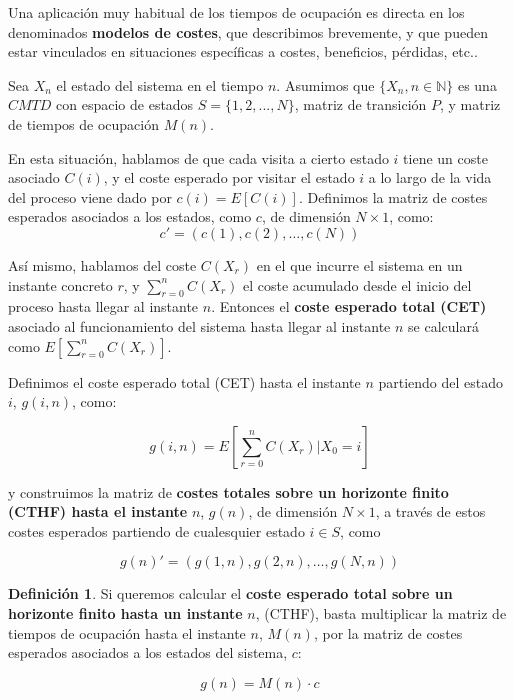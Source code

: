\documentclass[
]{book}
\newenvironment{yellowbox}{
  \definecolor{shadecolor}{rgb}{210, 180, 140}  
  \color{black}
  \begin{shaded}}
 {\end{shaded}}
\theoremstyle{definition}
\newtheorem{definition}{Definición}[chapter]
\theoremstyle{definition}
\theoremstyle{definition}
\theoremstyle{definition}
\theoremstyle{remark}
\begin{document}
Una aplicación muy habitual de los tiempos de ocupación es directa en los denominados \textbf{modelos de costes}, que describimos brevemente, y que pueden estar vinculados en situaciones específicas a costes, beneficios, pérdidas, etc..

Sea \(X_n\) el estado del sistema en el tiempo \(n\). Asumimos que \(\{X_n, n \in \mathbb{N}\}\) es una \(CMTD\) con espacio de estados \(S =\{1, 2,...,N\}\), matriz de transición \(P\), y matriz de tiempos de ocupación \(M(n)\).

En esta situación, hablamos de que cada visita a cierto estado \(i\) tiene un coste asociado \(C(i)\), y el coste esperado por visitar el estado \(i\) a lo largo de la vida del proceso viene dado por \(c(i) = E[C(i)]\). Definimos la matriz de costes esperados asociados a los estados, como \(c\), de dimensión \(N\times 1\), como: \[c' = (c(1),c(2),\ldots,c(N))\]

Así mismo, hablamos del coste \(C(X_r)\) en el que incurre el sistema en un instante concreto \(r\), y \(\sum_{r=0}^n C(X_r)\) el coste acumulado desde el inicio del proceso hasta llegar al instante \(n\). Entonces el \textbf{coste esperado total (CET)} asociado al funcionamiento del sistema hasta llegar al instante \(n\) se calculará como \(E\left[\sum_{r=0}^n C(X_r)\right]\).

Definimos el coste esperado total (CET) hasta el instante \(n\) partiendo del estado \(i\), \(g(i,n)\), como:

\[g(i,n) = E\left[\sum_{r=0}^n C(X_r)| X_0 = i \right]\]

y construimos la matriz de \textbf{costes totales sobre un horizonte finito (CTHF) hasta el instante} \(n\), \(g(n)\), de dimensión \(N \times 1\), a través de estos costes esperados partiendo de cualesquier estado \(i \in S\), como

\[g(n)' = (g(1,n),g(2,n),\ldots,g(N,n))\]

\begin{yellowbox}

\begin{definition}

Si queremos calcular el \textbf{coste esperado total sobre un horizonte finito hasta un instante} \(n\), (CTHF), basta multiplicar la matriz de tiempos de ocupación hasta el instante \(n\), \(M(n)\), por la matriz de costes esperados asociados a los estados del sistema, \(c\):

\begin{equation}
g(n) = M(n) \cdot c
\label{eq:CTHF}
\end{equation}

\end{definition}

\end{yellowbox}
\end{document}
